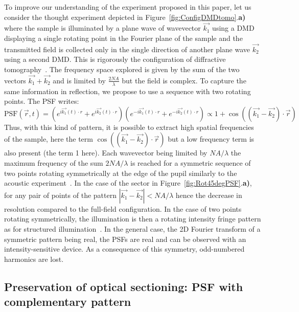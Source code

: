 \documentclass[%
reprint,
 amsmath,amssymb,
 aps,
]{revtex4-2}
\begin{document}
To improve our understanding of the experiment proposed in this paper, let us consider the thought experiment depicted in Figure~\ref{fig:ConfigDMDtomo}.\textbf{a)} where the sample is illuminated by a plane wave of wavevector $\overrightarrow{k_1}$ using a DMD displaying a single rotating point in the Fourier plane of the sample and the transmitted field is collected only in the single direction of another plane wave $\overrightarrow{k_2}$ using a second DMD. This is rigorously the configuration of diffractive tomography~\cite{Tomoreview}. The frequency space explored is given by the sum of the two vectors $\overrightarrow{k_1}+\overrightarrow{k_2}$ and is limited by $\frac{2 N\!A}{\lambda}$ but the field is complex. To capture the same information in reflection, we propose to use a sequence with two rotating points. The PSF writes:
\begin{equation}
    \textrm{PSF}(\overrightarrow{r},t)=\left(e^{i\overrightarrow{k_1}(t)\cdot r}+e^{i\overrightarrow{k_2}(t)\cdot r}\right)\left(e^{-i\overrightarrow{k_1}(t)\cdot r}+e^{-i\overrightarrow{k_2}(t)\cdot r}\right)\propto 1+\cos\left((\overrightarrow{k_1}-\overrightarrow{k_2})\cdot \overrightarrow{r}\right)
\end{equation}
Thus, with this kind of pattern, it is possible to extract high spatial frequencies of the sample, here the term $\cos\left((\overrightarrow{k_1}-\overrightarrow{k_2})\cdot \overrightarrow{r}\right)$ but a low frequency term is also present (the term 1 here). Each wavevector being limited by $N\!A/\lambda$ the maximum frequency of the sum $2N\!A/\lambda$ is reached for a symmetric sequence of two points rotating symmetrically at the edge of the pupil similarly to the acoustic experiment~\cite{PRAppliedAcoustic_Noetinger}. In the case of the sector in Figure~\ref{fig:Rot45degPSF}.\textbf{a)}, for any pair of points of the pattern $|\overrightarrow{k_1}-\overrightarrow{k_2}|<N\!A/\lambda$ hence the decrease in resolution compared to the full-field configuration. In the case of two points rotating symmetrically, the illumination is then a rotating intensity fringe pattern as for structured illumination~\cite{StructuredIll}. In the general case, the 2D Fourier transform of a symmetric pattern being real, the PSFs are real and can be observed with an intensity-sensitive device. As a consequence of this symmetry, odd-numbered harmonics are lost.

\subsection{Preservation of optical sectioning: PSF with complementary pattern} \label{subs:Comp}
\end{document}
